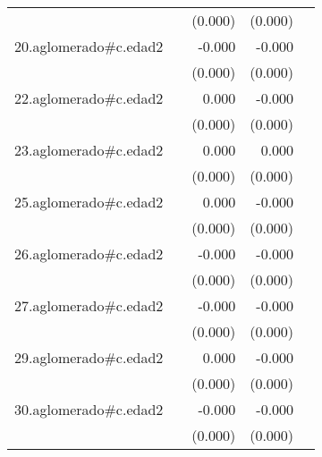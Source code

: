 {\begin{longtable}{l*{4}{D{.}{.}{-1}}}
            &                     &     (0.000)         &     (0.000)         &                     \\
\addlinespace
20.aglomerado#c.edad2&                     &      -0.000         &      -0.000\sym{*}  &                     \\
            &                     &     (0.000)         &     (0.000)         &                     \\
\addlinespace
22.aglomerado#c.edad2&                     &       0.000         &      -0.000         &                     \\
            &                     &     (0.000)         &     (0.000)         &                     \\
\addlinespace
23.aglomerado#c.edad2&                     &       0.000         &       0.000         &                     \\
            &                     &     (0.000)         &     (0.000)         &                     \\
\addlinespace
25.aglomerado#c.edad2&                     &       0.000         &      -0.000         &                     \\
            &                     &     (0.000)         &     (0.000)         &                     \\
\addlinespace
26.aglomerado#c.edad2&                     &      -0.000         &      -0.000         &                     \\
            &                     &     (0.000)         &     (0.000)         &                     \\
\addlinespace
27.aglomerado#c.edad2&                     &      -0.000         &      -0.000         &                     \\
            &                     &     (0.000)         &     (0.000)         &                     \\
\addlinespace
29.aglomerado#c.edad2&                     &       0.000         &      -0.000         &                     \\
            &                     &     (0.000)         &     (0.000)         &                     \\
\addlinespace
30.aglomerado#c.edad2&                     &      -0.000         &      -0.000         &                     \\
            &                     &     (0.000)         &     (0.000)         &                     \\

\end{longtable}}
